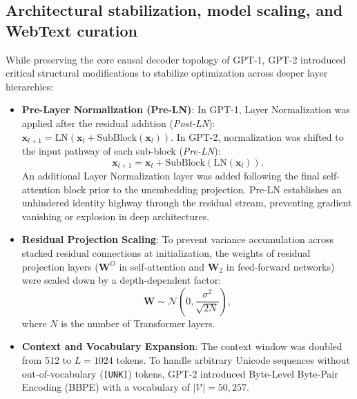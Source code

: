 \documentclass[../../main.tex]{subfiles}
\begin{document}
\subsection{Architectural stabilization, model scaling, and WebText curation}
\label{subsec:gpt2_setup}

While preserving the core causal decoder topology of GPT-1, GPT-2 introduced critical structural modifications to stabilize optimization across deeper layer hierarchies:
\begin{itemize}
    \item \textbf{Pre-Layer Normalization (Pre-LN)}: In GPT-1, Layer Normalization was applied after the residual addition (\emph{Post-LN}): $\mathbf{x}_{l+1} = \text{LN}(\mathbf{x}_l + \text{SubBlock}(\mathbf{x}_l))$. In GPT-2, normalization was shifted to the input pathway of each sub-block (\emph{Pre-LN}):
    \begin{equation}
    \mathbf{x}_{l+1} = \mathbf{x}_l + \text{SubBlock}(\text{LN}(\mathbf{x}_l)).
    \label{eq:pre_layer_norm}
    \end{equation}
    An additional Layer Normalization layer was added following the final self-attention block prior to the unembedding projection. Pre-LN establishes an unhindered identity highway through the residual stream, preventing gradient vanishing or explosion in deep architectures.
    
    \item \textbf{Residual Projection Scaling}: To prevent variance accumulation across stacked residual connections at initialization, the weights of residual projection layers ($\mathbf{W}^O$ in self-attention and $\mathbf{W}_2$ in feed-forward networks) were scaled down by a depth-dependent factor:
    \begin{equation}
    \mathbf{W} \sim \mathcal{N}\left(0, \frac{\sigma^2}{\sqrt{2N}}\right),
    \label{eq:residual_scaling}
    \end{equation}
    where $N$ is the number of Transformer layers.
    
    \item \textbf{Context and Vocabulary Expansion}: The context window was doubled from 512 to $L = 1024$ tokens. To handle arbitrary Unicode sequences without out-of-vocabulary (\texttt{[UNK]}) tokens, GPT-2 introduced Byte-Level Byte-Pair Encoding (BBPE) with a vocabulary of $|\mathcal{V}| = 50,257$.
\end{itemize}
\end{document}
